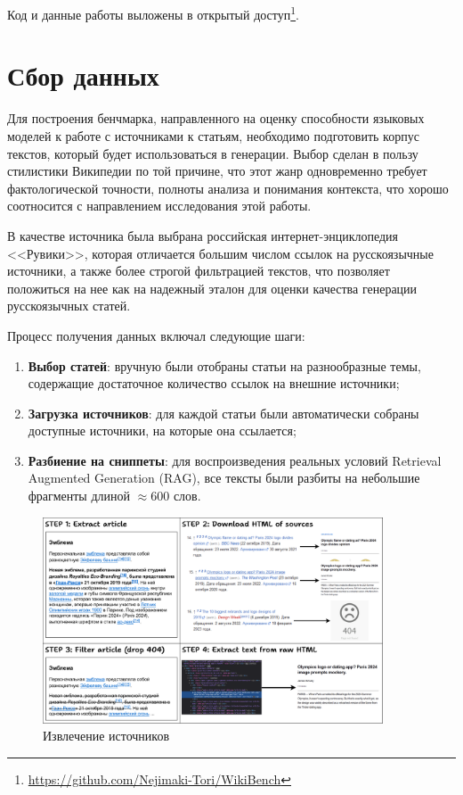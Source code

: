 \documentclass{article}
\begin{document}
Код и данные работы выложены в открытый доступ\footnote{\url{https://github.com/Nejimaki-Tori/WikiBench}}.

\section*{Сбор данных}

Для построения бенчмарка, направленного на оценку способности языковых моделей к работе с источниками к статьям, необходимо подготовить корпус текстов, который будет использоваться в генерации. 
Выбор сделан в пользу стилистики Википедии по той причине, что этот жанр одновременно требует фактологической точности, полноты анализа и понимания контекста, что хорошо соотносится с направлением исследования этой работы.

В качестве источника была выбрана российская интернет-энциклопедия <<Рувики>>, которая отличается большим числом ссылок на русскоязычные источники, а также более строгой фильтрацией текстов, 
что позволяет положиться на нее как на надежный эталон для оценки качества генерации русскоязычных статей.

Процесс получения данных включал следующие шаги:

\begin{enumerate}

    \item \textbf{Выбор статей}: вручную были отобраны статьи на разнообразные темы, содержащие достаточное количество ссылок на внешние источники;
    
    \item \textbf{Загрузка источников}: для каждой статьи были автоматически собраны доступные источники, на которые она ссылается;
    
    \item \parbox[t]{0.9\textwidth}{\textbf{Разбиение на сниппеты}: для воспроизведения реальных условий Retrieval Augmented Generation (RAG), все тексты были разбиты на небольшие фрагменты длиной $\approx 600$ слов.}

\end{enumerate}

\begin{figure}[ht!]
  \centering
  \includegraphics[width=0.9\textwidth]{figures/Source_extract.png}
  \caption{Извлечение источников}
  \label{fig:source}
\end{figure}
\end{document}
